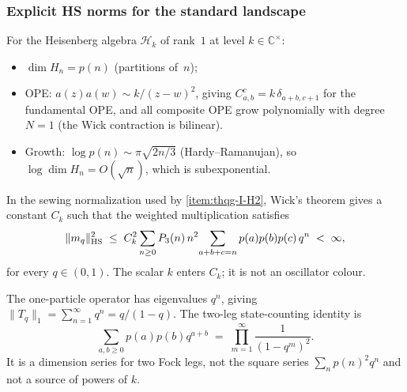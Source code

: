 \subsubsection{Explicit HS norms for the standard landscape}

\begin{computation}
\label{comp:thqg-I-hs-heisenberg}
For the Heisenberg algebra $\mathcal{H}_k$ of rank~$1$ at level $k \in \mathbb{C}^{\times}$:
\begin{itemize}
\item $\dim H_n = p(n)$ (partitions of~$n$);
\item OPE: $a(z)a(w) \sim k/(z-w)^2$, giving $C^c_{a,b} = k\,\delta_{a+b,c+1}$ for the fundamental OPE, and all composite OPE grow polynomially with degree $N = 1$ (the Wick contraction is bilinear).
\item Growth: $\log p(n) \sim \pi\sqrt{2n/3}$ (Hardy--Ramanujan), so $\log \dim H_n = O(\sqrt{n})$, which is subexponential.
\end{itemize}
In the sewing normalization used by \ref{item:thqg-I-H2}, Wick's
theorem gives a constant $C_k$ such that the weighted multiplication
satisfies
\begin{equation}%
\|m_q\|_{\HS}^2
\;\leq\;
C_k^2\sum_{n \geq 0} P_3(n)\,n^2
\!\sum_{\substack{a+b+c=n}} p(a)p(b)p(c)\,q^n
\;<\;\infty ,
\end{equation}
for every $q \in (0,1)$. The scalar $k$ enters $C_k$; it is not an
oscillator colour.

The one-particle operator has eigenvalues $q^n$, giving
$\|T_q\|_1 = \sum_{n=1}^\infty q^n = q/(1-q)$. The two-leg
state-counting identity is
\begin{equation}%
\sum_{a,b \geq 0} p(a)p(b)q^{a+b}
\;=\;
\prod_{m=1}^\infty \frac{1}{(1-q^m)^2}.
\end{equation}
It is a dimension series for two Fock legs, not the square series
$\sum_n p(n)^2q^n$ and not a source of powers of $k$.
\end{computation}

